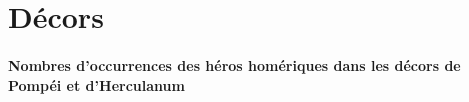 \documentclass[14pt]{these}
\begin{document}
\tableofcontents*


\part{Décors}
\newcommand{\decor}[2][]{
  {
    \setkeys{bdd}{#1}
    \centering
    \texttt{[image: \#2]}

    \vfill
    \ifx\BDDhouse\empty\else\BDDhouse\\\fi
    \BDDname\\
    \textbf{Sujet:} \BDDsubject\\
    \textbf{Type:} \BDDtype\\ 
    \textbf{Datation:} \BDDdate\\ 
    \textbf{Pièce, paroi:} \BDDroom, \BDDwall\\
    \textbf{Artiste:} \BDDartist\\ 
    \textbf{Localisation actuelle:} \BDDlocation\\
    \textbf{Crédits photographiques:} \BDDcredits

    \vspace{2\onelineskip}
  }
  \clearpage
}


\subsection*{Nombres d'occurrences des héros homériques dans les décors de Pompéi
et d'Herculanum}
\end{document}
